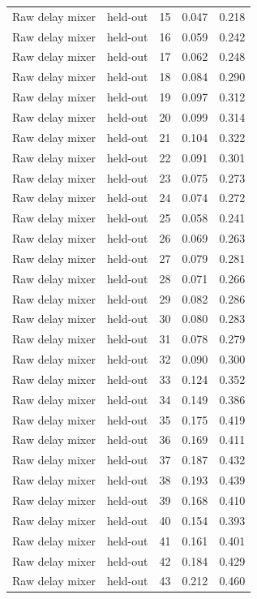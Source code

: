 \begin{tabular}{llrrr}
Raw delay mixer & held-out & 15 & 0.047 & 0.218 \\
Raw delay mixer & held-out & 16 & 0.059 & 0.242 \\
Raw delay mixer & held-out & 17 & 0.062 & 0.248 \\
Raw delay mixer & held-out & 18 & 0.084 & 0.290 \\
Raw delay mixer & held-out & 19 & 0.097 & 0.312 \\
Raw delay mixer & held-out & 20 & 0.099 & 0.314 \\
Raw delay mixer & held-out & 21 & 0.104 & 0.322 \\
Raw delay mixer & held-out & 22 & 0.091 & 0.301 \\
Raw delay mixer & held-out & 23 & 0.075 & 0.273 \\
Raw delay mixer & held-out & 24 & 0.074 & 0.272 \\
Raw delay mixer & held-out & 25 & 0.058 & 0.241 \\
Raw delay mixer & held-out & 26 & 0.069 & 0.263 \\
Raw delay mixer & held-out & 27 & 0.079 & 0.281 \\
Raw delay mixer & held-out & 28 & 0.071 & 0.266 \\
Raw delay mixer & held-out & 29 & 0.082 & 0.286 \\
Raw delay mixer & held-out & 30 & 0.080 & 0.283 \\
Raw delay mixer & held-out & 31 & 0.078 & 0.279 \\
Raw delay mixer & held-out & 32 & 0.090 & 0.300 \\
Raw delay mixer & held-out & 33 & 0.124 & 0.352 \\
Raw delay mixer & held-out & 34 & 0.149 & 0.386 \\
Raw delay mixer & held-out & 35 & 0.175 & 0.419 \\
Raw delay mixer & held-out & 36 & 0.169 & 0.411 \\
Raw delay mixer & held-out & 37 & 0.187 & 0.432 \\
Raw delay mixer & held-out & 38 & 0.193 & 0.439 \\
Raw delay mixer & held-out & 39 & 0.168 & 0.410 \\
Raw delay mixer & held-out & 40 & 0.154 & 0.393 \\
Raw delay mixer & held-out & 41 & 0.161 & 0.401 \\
Raw delay mixer & held-out & 42 & 0.184 & 0.429 \\
Raw delay mixer & held-out & 43 & 0.212 & 0.460 \\

\end{tabular}
